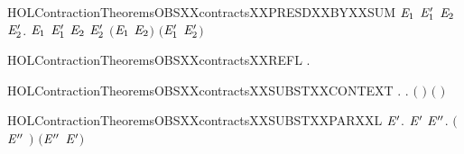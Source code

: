 \begin{SaveVerbatim}{HOLContractionTheoremsOBSXXcontractsXXPRESDXXBYXXSUM}
\HOLTokenTurnstile{} \HOLSymConst{\HOLTokenForall{}}\ensuremath{\HOLBoundVar{E}\sb{\mathrm{1}}} \ensuremath{\HOLBoundVar{E}\sb{\mathrm{1}}\sp{\prime}} \ensuremath{\HOLBoundVar{E}\sb{\mathrm{2}}} \ensuremath{\HOLBoundVar{E}\sb{\mathrm{2}}\sp{\prime}}.
        \ensuremath{\HOLBoundVar{E}\sb{\mathrm{1}}} \ensuremath{\HOLBoundVar{E}\sb{\mathrm{1}}\sp{\prime}} \HOLSymConst{\HOLTokenConj{}}  \ensuremath{\HOLBoundVar{E}\sb{\mathrm{2}}} \ensuremath{\HOLBoundVar{E}\sb{\mathrm{2}}\sp{\prime}} \HOLSymConst{\HOLTokenImp{}}
        \ensuremath{(}\ensuremath{\HOLBoundVar{E}\sb{\mathrm{1}}} \HOLSymConst{\ensuremath{+}} \ensuremath{\HOLBoundVar{E}\sb{\mathrm{2}}}\ensuremath{)} \ensuremath{(}\ensuremath{\HOLBoundVar{E}\sb{\mathrm{1}}\sp{\prime}} \HOLSymConst{\ensuremath{+}} \ensuremath{\HOLBoundVar{E}\sb{\mathrm{2}}\sp{\prime}}\ensuremath{)}
\end{SaveVerbatim}
\newcommand{\HOLContractionTheoremsOBSXXcontractsXXPRESDXXBYXXSUM}{\UseVerbatim{HOLContractionTheoremsOBSXXcontractsXXPRESDXXBYXXSUM}}
\begin{SaveVerbatim}{HOLContractionTheoremsOBSXXcontractsXXREFL}
\HOLTokenTurnstile{} \HOLSymConst{\HOLTokenForall{}}.   
\end{SaveVerbatim}
\newcommand{\HOLContractionTheoremsOBSXXcontractsXXREFL}{\UseVerbatim{HOLContractionTheoremsOBSXXcontractsXXREFL}}
\begin{SaveVerbatim}{HOLContractionTheoremsOBSXXcontractsXXSUBSTXXCONTEXT}
\HOLTokenTurnstile{} \HOLSymConst{\HOLTokenForall{}} .
          \HOLSymConst{\HOLTokenImp{}}
       \HOLSymConst{\HOLTokenForall{}}.   \HOLSymConst{\HOLTokenImp{}}  \ensuremath{(} \ensuremath{)} \ensuremath{(} \ensuremath{)}
\end{SaveVerbatim}
\newcommand{\HOLContractionTheoremsOBSXXcontractsXXSUBSTXXCONTEXT}{\UseVerbatim{HOLContractionTheoremsOBSXXcontractsXXSUBSTXXCONTEXT}}
\begin{SaveVerbatim}{HOLContractionTheoremsOBSXXcontractsXXSUBSTXXPARXXL}
\HOLTokenTurnstile{} \HOLSymConst{\HOLTokenForall{}} \ensuremath{\HOLBoundVar{E}\sp{\prime}}.
         \ensuremath{\HOLBoundVar{E}\sp{\prime}} \HOLSymConst{\HOLTokenImp{}}
       \HOLSymConst{\HOLTokenForall{}}\ensuremath{\HOLBoundVar{E}\sp{\prime\prime}}.  \ensuremath{(}\ensuremath{\HOLBoundVar{E}\sp{\prime\prime}} \HOLSymConst{\ensuremath{\mid}} \ensuremath{)} \ensuremath{(}\ensuremath{\HOLBoundVar{E}\sp{\prime\prime}} \HOLSymConst{\ensuremath{\mid}} \ensuremath{\HOLBoundVar{E}\sp{\prime}}\ensuremath{)}
\end{SaveVerbatim}
